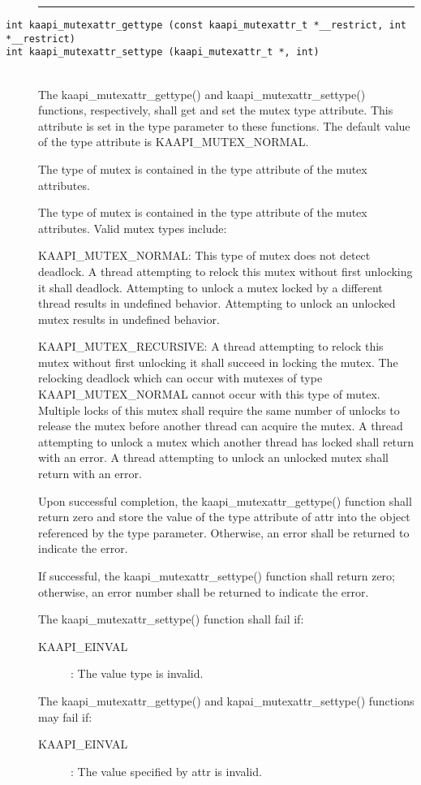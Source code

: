 \begin{description}
\vspace*{3ex} \hrule width 4cm
\item [\texttt{int kaapi\_mutexattr\_gettype (const kaapi\_mutexattr\_t *\_\_restrict, int *\_\_restrict)}]
\item [\texttt{int kaapi\_mutexattr\_settype (kaapi\_mutexattr\_t *, int)}]~\\

The kaapi\_mutexattr\_gettype() and kaapi\_mutexattr\_settype() functions,
respectively, shall get and set the mutex type attribute. This attribute is
set in the type parameter to these functions. The default value of the type
attribute is KAAPI\_MUTEX\_NORMAL.

The type of mutex is contained in the type attribute of the mutex attributes.

The type of mutex is contained in the type attribute of the mutex
attributes. Valid mutex types include:

KAAPI\_MUTEX\_NORMAL: This type of mutex does not detect deadlock. A thread
attempting to relock this mutex without first unlocking it shall
deadlock. Attempting to unlock a mutex locked by a different thread results in
undefined behavior. Attempting to unlock an unlocked mutex results in
undefined behavior.

KAAPI\_MUTEX\_RECURSIVE: A thread attempting to relock this mutex without
first unlocking it shall succeed in locking the mutex. The relocking deadlock
which can occur with mutexes of type KAAPI\_MUTEX\_NORMAL cannot occur with
this type of mutex. Multiple locks of this mutex shall require the same number
of unlocks to release the mutex before another thread can acquire the mutex. A
thread attempting to unlock a mutex which another thread has locked shall
return with an error. A thread attempting to unlock an unlocked mutex shall
return with an error.

Upon successful completion, the kaapi\_mutexattr\_gettype() function shall
return zero and store the value of the type attribute of attr into the object
referenced by the type parameter. Otherwise, an error shall be returned to
indicate the error.

If successful, the kaapi\_mutexattr\_settype() function shall return zero;
otherwise, an error number shall be returned to indicate the error.

The kaapi\_mutexattr\_settype() function shall fail if:

\begin{description}
\item [KAAPI\_EINVAL]: The value type is invalid.
\end{description}

The kaapi\_mutexattr\_gettype() and kapai\_mutexattr\_settype() functions may
fail if:

\begin{description}
\item [KAAPI\_EINVAL]: The value specified by attr is invalid.
\end{description}
\end{description}


